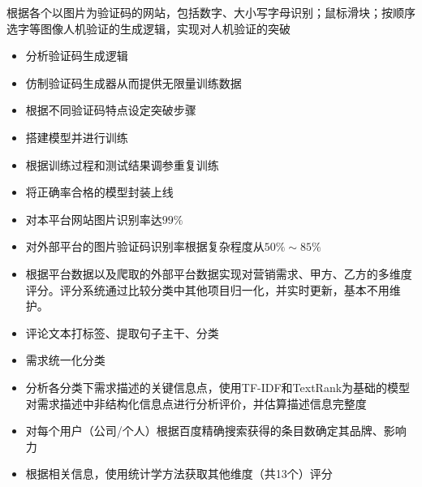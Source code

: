 \documentclass[9pt,a4paper]{altacv}
\begin{document}
%
%
%
%
%
%
\begin{fullwidth}
	
	
	\begin{multicols}{2}
		
		根据各个以图片为验证码的网站，包括数字、大小写字母识别；鼠标滑块；按顺序选字等图像人机验证的生成逻辑，实现对人机验证的突破
		\begin{itemize}
			\item 分析验证码生成逻辑
			\item 仿制验证码生成器从而提供无限量训练数据
			\item 根据不同验证码特点设定突破步骤
			\item 搭建模型并进行训练
			\item 根据训练过程和测试结果调参重复训练
			\item 将正确率合格的模型封装上线
			\item 对本平台网站图片识别率达$99\%$
			\item 对外部平台的图片验证码识别率根据复杂程度从$50\% \sim 85\%$
		\end{itemize}
		
		\divider
		
		\begin{itemize}
			\item 根据平台数据以及爬取的外部平台数据实现对营销需求、甲方、乙方的多维度评分。评分系统通过比较分类中其他项目归一化，并实时更新，基本不用维护。
			\item 评论文本打标签、提取句子主干、分类
			\item 需求统一化分类
			\item 分析各分类下需求描述的关键信息点，使用TF-IDF和TextRank为基础的模型对需求描述中非结构化信息点进行分析评价，并估算描述信息完整度
			\item 对每个用户（公司/个人）根据百度精确搜索获得的条目数确定其品牌、影响力
			\item 根据相关信息，使用统计学方法获取其他维度（共13个）评分
		\end{itemize}
		

\end{multicols}
\end{fullwidth}
\end{document}

